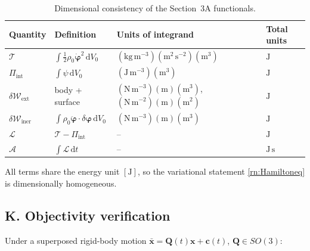 \documentclass[11pt]{article}
\begin{document}
\begin{table}[h]
\centering
\caption{Dimensional consistency of the Section~3A functionals.}
\label{tab:dim3a}
\begin{tabular}{llll}
\toprule
Quantity & Definition & Units of integrand & Total units \\
\midrule
$\mathcal{T}$ & $\int\tfrac12\rho_{0}\dot{\boldsymbol{\varphi}}^{2}\,\mathrm{d}V_{0}$ & $(\mathrm{kg\,m^{-3}})(\mathrm{m^{2}\,s^{-2}})(\mathrm{m^{3}})$ & $\mathrm{J}$ \\
$\Pi_{\mathrm{int}}$ & $\int\psi\,\mathrm{d}V_{0}$ & $(\mathrm{J\,m^{-3}})(\mathrm{m^{3}})$ & $\mathrm{J}$ \\
$\delta\mathcal{W}_{\mathrm{ext}}$ & body + surface & $(\mathrm{N\,m^{-3}})(\mathrm{m})(\mathrm{m^{3}})$, $(\mathrm{N\,m^{-2}})(\mathrm{m})(\mathrm{m^{2}})$ & $\mathrm{J}$ \\
$\delta\mathcal{W}_{\mathrm{iner}}$ & $\int\rho_{0}\ddot{\boldsymbol{\varphi}}\cdot\delta\boldsymbol{\varphi}\,\mathrm{d}V_{0}$ & $(\mathrm{N\,m^{-3}})(\mathrm{m})(\mathrm{m^{3}})$ & $\mathrm{J}$ \\
$\mathcal{L}$ & $\mathcal{T}-\Pi_{\mathrm{int}}$ & -- & $\mathrm{J}$ \\
$\mathcal{A}$ & $\int\mathcal{L}\,\mathrm{d}t$ & -- & $\mathrm{J\,s}$ \\
\bottomrule
\end{tabular}
\end{table}

All terms share the energy unit $[\mathrm{J}]$, so the variational statement \eqref{rn:Hamiltoneq} is dimensionally homogeneous. \checkmark

\subsection{K. Objectivity verification}

Under a superposed rigid-body motion $\bar{\mathbf{x}}=\mathbf{Q}(t)\mathbf{x}+\mathbf{c}(t)$, $\mathbf{Q}\in SO(3)$:
\end{document}
